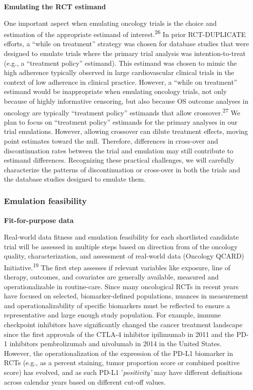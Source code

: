 \documentclass[
  letterpaper,
  DIV=11,
  numbers=noendperiod]{scrartcl}
\makeatletter
\let\oldparagraph\paragraph
\renewcommand{\paragraph}{
    \@ifstar
      \xxxParagraphStar
      \xxxParagraphNoStar
  }
\newcommand{\xxxParagraphStar}[1]{\oldparagraph*{#1}\mbox{}}
\newcommand{\xxxParagraphNoStar}[1]{\oldparagraph{#1}\mbox{}}
\makeatother
\begin{document}
\textbf{Emulating the RCT estimand}

One important aspect when emulating oncology trials is the choice and
estimation of the appropriate estimand of interest.\textsuperscript{26}
In prior RCT-DUPLICATE efforts, a ``while on treatment'' strategy was
chosen for database studies that were designed to emulate trials where
the primary trial analysis was intention-to-treat (e.g., a ``treatment
policy'' estimand). This estimand was chosen to mimic the high adherence
typically observed in large cardiovascular clinical trials in the
context of low adherence in clinical practice. However, a ``while on
treatment'' estimand would be inappropriate when emulating oncology
trials, not only because of highly informative censoring, but also
because OS outcome analyses in oncology are typically ``treatment
policy'' estimands that allow crossover.\textsuperscript{27} We plan to
focus on ``treatment policy'' estimands for the primary analyses in our
trial emulations. However, allowing crossover can dilute treatment
effects, moving point estimates toward the null. Therefore, differences
in cross-over and discontinuation rates between the trial and emulation
may still contribute to estimand differences. Recognizing these
practical challenges, we will carefully characterize the patterns of
discontinuation or cross-over in both the trials and the database
studies designed to emulate them.

\subsubsection{Emulation feasibility}\label{emulation-feasibility}

\paragraph{\texorpdfstring{\textbf{Fit-for-purpose
data}}{Fit-for-purpose data}}\label{fit-for-purpose-data}

Real-world data fitness and emulation feasibility for each shortlisted
candidate trial will be assessed in multiple steps based on direction
from of the oncology quality, characterization, and assessment of
real-world data (Oncology QCARD) Initiative.\textsuperscript{19} The
first step assesses if relevant variables like exposure, line of
therapy, outcomes, and covariates are generally available, measured and
operationalizable in routine-care. Since many oncological RCTs in recent
years have focused on selected, biomarker-defined populations, nuances
in measurement and operationalizability of specific biomarkers must be
reflected to ensure a representative and large enough study population.
For example, immune checkpoint inhibitors have significantly changed the
cancer treatment landscape since the first approvals of the CTLA-4
inhibitor ipilimumab in 2011 and the PD-1 inhibitors pembrolizumab and
nivolumab in 2014 in the United States. However, the operationalization
of the expression of the PD-L1 biomarker in RCTs (e.g., as a percent
staining, tumor proportion score or combined positive score) has
evolved, and as such PD-L1 '\emph{positivity'} may have different
definitions across calendar years based on different cut-off values.
\end{document}

